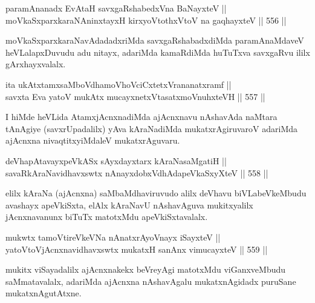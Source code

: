 \begin{shl}
paramAnanadx EvAtaH savxgaRshabedxVna BaNayxteV || \\
moVkaSxparxkaraNAninxtayxH kirxyoVtothxV\s toV na gaqhayxteV \hfill || 556 ||  
\end{shl}	

\begin{artha}
moVkaSxparxkaraNavAdadadxriMda savxgaRshabadxdiMda paramAnaMdaveV
heVLalapxDuvudu adu nitayx, adariMda kamaRdiMda huTuTxva savxgaRvu
ililx gArxhayxvalalx.
\end{artha}


\begin{shl}
ita ukAtxtamxsaMboVdhamoVhoVciCxtetxVrananatxramf || \\
savxta Eva yatoV mukAtx mucayxnetxV\s tasatxmoVnuhxteVH \hfill || 557 ||  
\end{shl}

\begin{artha}
I hiMde heVLida AtamxjAcnxnadiMda ajAcnxnavu nAshavAda naMtara
tAnAgiye (savxrUpadalilx) yAva kAraNadiMda mukatxrAgiruvaroV adariMda
ajAcnxna nivaqtitxyiMdaleV mukatxrAguvaru.
\end{artha}

\begin{shl}
deVhapAtavayxpeVkASx sAyxdayxtarx kAraNasaMgatiH || \\
savaRkAraNavidhavxswtx nAnayxdobxVdhAdapeVkaSxyXteV \hfill || 558 ||  
\end{shl}

\begin{artha}
elilx kAraNa (ajAcnxna) saMbaMdhaviruvudo alilx deVhavu
biVLabeVkeMbudu avashayx apeVkiSxta, elAlx kAraNavU nAshavAguva
mukitxyalilx jAcnxnavanunx biTuTx matotxMdu apeVkiSxtavalalx.
\end{artha}

\begin{shl}
mukwtx tamoVtireVkeVNa nAnatxrAyoV\s nayx iSayxteV || \\
yatoV\s toV\s jAcnxnavidhavxswtx mukatxH sanAnx vimucayxteV \hfill || 559 ||  
\end{shl}

\begin{artha}
mukitx viSayadalilx ajAcnxnakekx beVreyAgi matotxMdu viGanxveMbudu
saMmatavalalx, adariMda ajAcnxna nAshavAgalu mukatxnAgidadx puruSane mukatxnAgutAtxne.
\end{artha}


